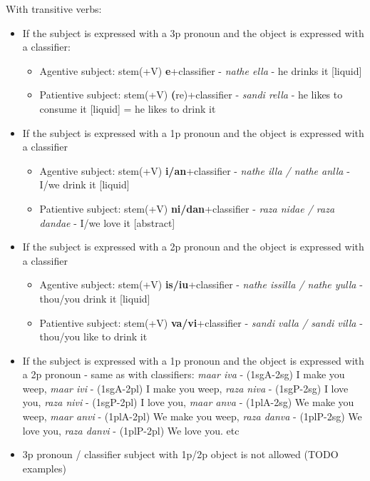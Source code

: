 \documentclass[8pt]{book}
\begin{document}
With transitive verbs:

\begin{itemize}
	\item If the subject is expressed with a 3p pronoun and the object is expressed with a classifier:
	\begin{itemize}
	\item Agentive subject: stem(+V) \textbf{e}+classifier - \textit{nathe ella} - he drinks it [liquid]
	\item Patientive subject: stem(+V) \textbf(re)+classifier - \textit{sandi rella} - he likes to consume it [liquid] = he likes to drink it 
	\end{itemize}
	\item If the subject is expressed with a 1p pronoun and the object is expressed with a classifier
	\begin{itemize}
	\item Agentive subject: stem(+V) \textbf{i/an}+classifier - \textit{nathe illa / nathe anlla} - I/we drink it [liquid]
	\item Patientive subject: stem(+V) \textbf{ni/dan}+classifier - \textit{raza nidae / raza dandae} - I/we love it [abstract]  
	\end{itemize}
	\item If the subject is expressed with a 2p pronoun and the object is expressed with a classifier
	\begin{itemize}
	\item Agentive subject: stem(+V) \textbf{is/iu}+classifier - \textit{nathe issilla / nathe yulla} - thou/you drink it [liquid]
	\item Patientive subject: stem(+V) \textbf{va/vi}+classifier - \textit{sandi valla / sandi villa} - thou/you like to drink it
	\end{itemize}
	\item If the subject is expressed with a 1p pronoun and the object is expressed with a 2p pronoun - same as with classifiers: 
		\textit{maar iva} - (1sgA-2sg) I make you weep,
		\textit{maar ivi} - (1sgA-2pl) I make you weep,
		\textit{raza niva} - (1sgP-2sg) I love you,
		\textit{raza nivi} - (1sgP-2pl) I love you,
		\textit{maar anva} - (1plA-2sg) We make you weep,
		\textit{maar anvi} - (1plA-2pl) We make you weep,
		\textit{raza danva} - (1plP-2sg) We love you,
		\textit{raza danvi} - (1plP-2pl) We love you. etc
		
	\item 3p pronoun / classifier subject with 1p/2p object is not allowed (TODO examples) 

\end{itemize}
\end{document}
